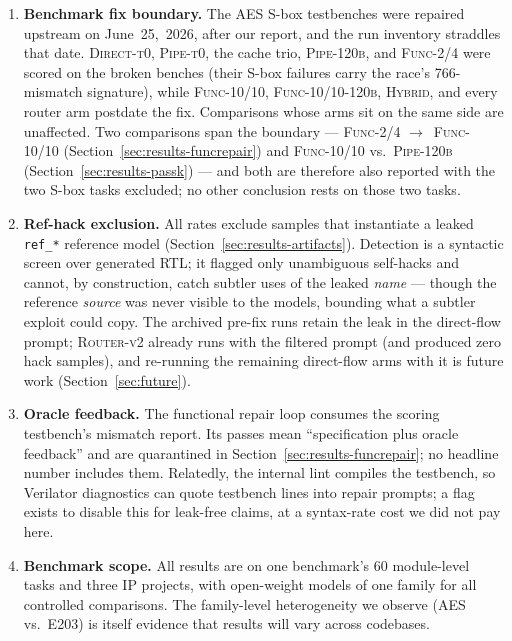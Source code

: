 \begin{enumerate}
    --- and Section~\ref{sec:results-artifacts} showed our own internal
    gate was at times \emph{stricter than the scorer}, deflating four
    tasks.
  \item \textbf{Benchmark fix boundary.} The AES S-box testbenches were
    repaired upstream on June~25,~2026, after our report, and the run
    inventory straddles that date. \textsc{Direct-t0}, \textsc{Pipe-t0},
    the cache trio, \textsc{Pipe-120b}, and \textsc{Func-2/4} were
    scored on the broken benches (their S-box failures carry the race's
    766-mismatch signature), while \textsc{Func-10/10},
    \textsc{Func-10/10-120b}, \textsc{Hybrid}, and every router arm
    postdate the fix.
    Comparisons whose arms sit on the same side are unaffected. Two
    comparisons span the boundary --- \textsc{Func-2/4}
    $\to$~\textsc{Func-10/10} (Section~\ref{sec:results-funcrepair})
    and \textsc{Func-10/10} vs.\ \textsc{Pipe-120b}
    (Section~\ref{sec:results-passk}) --- and both are therefore also
    reported with the two S-box tasks excluded; no other conclusion
    rests on those two tasks.
  \item \textbf{Ref-hack exclusion.} All rates exclude samples that
    instantiate a leaked \texttt{ref\_*} reference model
    (Section~\ref{sec:results-artifacts}). Detection is a syntactic
    screen over generated RTL; it flagged only unambiguous
    self-hacks and cannot, by construction, catch subtler uses of the
    leaked \emph{name} --- though the reference \emph{source} was never
    visible to the models, bounding what a subtler exploit could copy.
    The archived pre-fix runs retain the leak in the direct-flow
    prompt; \textsc{Router-v2} already runs with the filtered prompt
    (and produced zero hack samples), and re-running the remaining
    direct-flow arms with it is future work
    (Section~\ref{sec:future}).
  \item \textbf{Oracle feedback.} The functional repair loop consumes
    the scoring testbench's mismatch report. Its passes mean
    ``specification plus oracle feedback'' and are quarantined in
    Section~\ref{sec:results-funcrepair}; no headline number includes
    them. Relatedly, the internal lint compiles the testbench, so
    Verilator diagnostics can quote testbench lines into repair prompts;
    a flag exists to disable this for leak-free claims, at a syntax-rate
    cost we did not pay here.
  \item \textbf{Benchmark scope.} All results are on one benchmark's 60
    module-level tasks and three IP projects, with open-weight models of
    one family for all controlled comparisons. The family-level
    heterogeneity we observe (AES vs.\ E203) is itself evidence that
    results will vary across codebases.
\end{enumerate}


